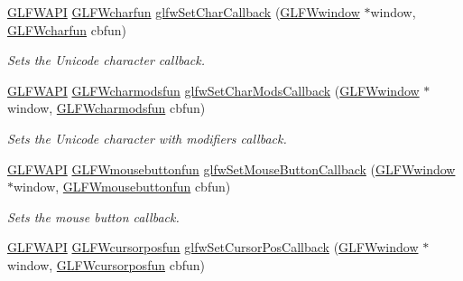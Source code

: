 \begin{DoxyCompactItemize}
\mbox{\hyperlink{glfw3_8h_a56da5036b2cc259351ae22fd6439bb47}{G\+L\+F\+W\+A\+PI}} \mbox{\hyperlink{group__input_gabf24451c7ceb1952bc02b17a0d5c3e5f}{G\+L\+F\+Wcharfun}} \mbox{\hyperlink{group__input_ga07b2959b23dc3e466ce7475746021002}{glfw\+Set\+Char\+Callback}} (\mbox{\hyperlink{group__window_ga3c96d80d363e67d13a41b5d1821f3242}{G\+L\+F\+Wwindow}} $\ast$window, \mbox{\hyperlink{group__input_gabf24451c7ceb1952bc02b17a0d5c3e5f}{G\+L\+F\+Wcharfun}} cbfun)
\begin{DoxyCompactList}\small\item\em Sets the Unicode character callback. \end{DoxyCompactList}\item 
\mbox{\hyperlink{glfw3_8h_a56da5036b2cc259351ae22fd6439bb47}{G\+L\+F\+W\+A\+PI}} \mbox{\hyperlink{group__input_gae36fb6897d2b7df9b128900c8ce9c507}{G\+L\+F\+Wcharmodsfun}} \mbox{\hyperlink{group__input_gae6eee0bda7429bfe8028615847cf6795}{glfw\+Set\+Char\+Mods\+Callback}} (\mbox{\hyperlink{group__window_ga3c96d80d363e67d13a41b5d1821f3242}{G\+L\+F\+Wwindow}} $\ast$window, \mbox{\hyperlink{group__input_gae36fb6897d2b7df9b128900c8ce9c507}{G\+L\+F\+Wcharmodsfun}} cbfun)
\begin{DoxyCompactList}\small\item\em Sets the Unicode character with modifiers callback. \end{DoxyCompactList}\item 
\mbox{\hyperlink{glfw3_8h_a56da5036b2cc259351ae22fd6439bb47}{G\+L\+F\+W\+A\+PI}} \mbox{\hyperlink{group__input_ga39893a4a7e7c3239c98d29c9e084350c}{G\+L\+F\+Wmousebuttonfun}} \mbox{\hyperlink{group__input_ga20e5ba1ce4e086aedd48a06dc311c95f}{glfw\+Set\+Mouse\+Button\+Callback}} (\mbox{\hyperlink{group__window_ga3c96d80d363e67d13a41b5d1821f3242}{G\+L\+F\+Wwindow}} $\ast$window, \mbox{\hyperlink{group__input_ga39893a4a7e7c3239c98d29c9e084350c}{G\+L\+F\+Wmousebuttonfun}} cbfun)
\begin{DoxyCompactList}\small\item\em Sets the mouse button callback. \end{DoxyCompactList}\item 
\mbox{\hyperlink{glfw3_8h_a56da5036b2cc259351ae22fd6439bb47}{G\+L\+F\+W\+A\+PI}} \mbox{\hyperlink{group__input_ga4cfad918fa836f09541e7b9acd36686c}{G\+L\+F\+Wcursorposfun}} \mbox{\hyperlink{group__input_ga9c49c0d3d3c775c3124726f1d902124d}{glfw\+Set\+Cursor\+Pos\+Callback}} (\mbox{\hyperlink{group__window_ga3c96d80d363e67d13a41b5d1821f3242}{G\+L\+F\+Wwindow}} $\ast$window, \mbox{\hyperlink{group__input_ga4cfad918fa836f09541e7b9acd36686c}{G\+L\+F\+Wcursorposfun}} cbfun)

\end{DoxyCompactItemize}
